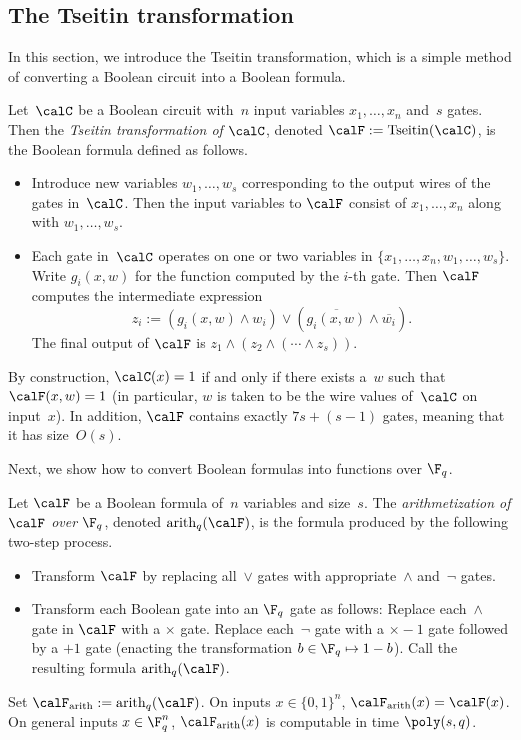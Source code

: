 \documentclass[11pt]{article}
\newcommand{\arith}[2]{\mathrm{arith}_{#1}(#2)}
\begin{document}
\subsection{The Tseitin transformation}

In this section, we introduce the Tseitin transformation, which is a simple method of converting a Boolean circuit into a Boolean formula.

\begin{definition}
Let~$\calC$ be a Boolean circuit with~$n$ input variables $x_1, \ldots, x_n$ and~$s$ gates.
Then the \emph{Tseitin transformation of $\calC$}, denoted $\calF := \mathrm{Tseitin}(\calC)$, is the Boolean formula defined as follows.
\begin{itemize}
\item[(i)] Introduce new variables $w_1, \ldots, w_s$ corresponding to the output wires of the gates in~$\calC$.
		Then the input variables to $\calF$ consist of  $x_1, \ldots, x_n$ along with $w_1, \ldots, w_s$.
\item[(ii)] Each gate in~$\calC$ operates on one or two variables in $\{x_1, \ldots, x_n, w_1, \ldots, w_s\}$.
		Write $g_i(x, w)$ for the function computed by the $i$-th gate.
		Then $\calF$ computes the intermediate expression
		\begin{equation*}
			z_i := (g_i(x, w) \land w_i) \lor (\overline{g_i(x, w)} \land \overline{w_i}).
		\end{equation*}
		The final output of $\calF$ is $z_1 \land (z_2 \land ( \cdots \land z_s))$.
\end{itemize}
By construction, $\calC(x) = 1$ if and only if there exists a~$w$ such that $\calF(x, w) = 1$
(in particular, $w$ is taken to be the wire values of~$\calC$ on input~$x$).
In addition, $\calF$ contains exactly $7s + (s-1)$ gates, meaning that it has size~$O(s)$.
\end{definition}

Next, we show how to convert Boolean formulas into functions over $\F_q$.

\begin{definition}[Arithmetization]\label{def:arithmetization}
Let $\calF$ be a Boolean formula of~$n$ variables and size~$s$.
The \emph{arithmetization of $\calF$ over $\F_q$}, denoted $\arith{q}{\calF}$, is the formula produced by the following two-step process.
\begin{itemize}
\item[(i)] Transform $\calF$ by replacing all~$\lor$ gates with appropriate~$\land$ and~$\neg$ gates.
\item[(ii)] Transform each Boolean gate into an $\F_q$ gate as follows:
		Replace each~$\land$ gate in $\calF$ with a $\times$ gate.
		Replace each~$\neg$ gate with a $\times -1$ gate followed by a $+1$ gate (enacting the transformation $b \in \F_q \mapsto 1-b$).
		Call the resulting formula $\arith{q}{\calF}$.
\end{itemize}
Set $\calF_{\mathrm{arith}} := \arith{q}{\calF}$.
On inputs $x \in \{0, 1\}^n$, $\calF_{\mathrm{arith}}(x) = \calF(x)$.
On general inputs $x \in \F_q^n$, $\calF_{\mathrm{arith}}(x)$ is computable in time $\poly(s, q)$.
\end{definition}
\end{document}
